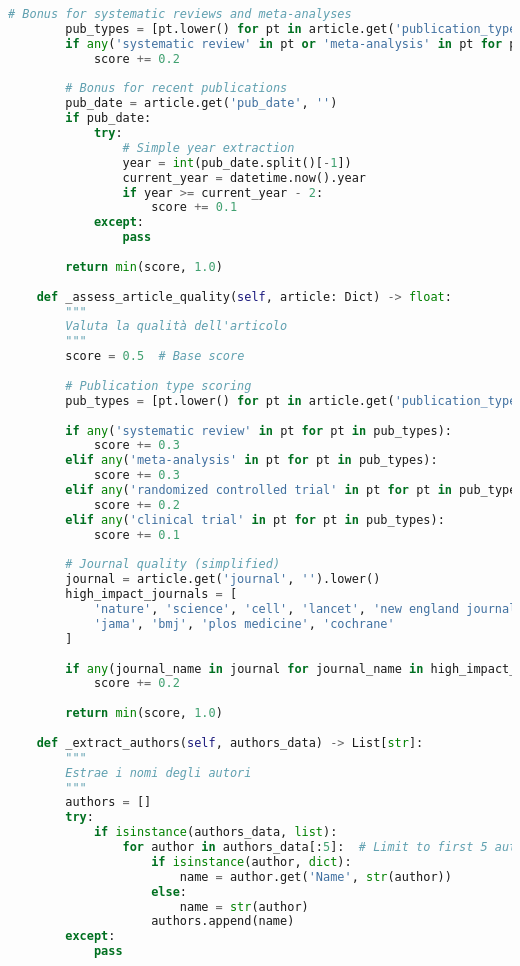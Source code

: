 \documentclass[12pt,a4paper]{report}
\begin{document}
\begin{lstlisting}[language=Python, caption=PubMed Service Implementation]
        # Bonus for systematic reviews and meta-analyses
        pub_types = [pt.lower() for pt in article.get('publication_types', [])]
        if any('systematic review' in pt or 'meta-analysis' in pt for pt in pub_types):
            score += 0.2
        
        # Bonus for recent publications
        pub_date = article.get('pub_date', '')
        if pub_date:
            try:
                # Simple year extraction
                year = int(pub_date.split()[-1])
                current_year = datetime.now().year
                if year >= current_year - 2:
                    score += 0.1
            except:
                pass
        
        return min(score, 1.0)
    
    def _assess_article_quality(self, article: Dict) -> float:
        """
        Valuta la qualità dell'articolo
        """
        score = 0.5  # Base score
        
        # Publication type scoring
        pub_types = [pt.lower() for pt in article.get('publication_types', [])]
        
        if any('systematic review' in pt for pt in pub_types):
            score += 0.3
        elif any('meta-analysis' in pt for pt in pub_types):
            score += 0.3
        elif any('randomized controlled trial' in pt for pt in pub_types):
            score += 0.2
        elif any('clinical trial' in pt for pt in pub_types):
            score += 0.1
        
        # Journal quality (simplified)
        journal = article.get('journal', '').lower()
        high_impact_journals = [
            'nature', 'science', 'cell', 'lancet', 'new england journal',
            'jama', 'bmj', 'plos medicine', 'cochrane'
        ]
        
        if any(journal_name in journal for journal_name in high_impact_journals):
            score += 0.2
        
        return min(score, 1.0)
    
    def _extract_authors(self, authors_data) -> List[str]:
        """
        Estrae i nomi degli autori
        """
        authors = []
        try:
            if isinstance(authors_data, list):
                for author in authors_data[:5]:  # Limit to first 5 authors
                    if isinstance(author, dict):
                        name = author.get('Name', str(author))
                    else:
                        name = str(author)
                    authors.append(name)
        except:
            pass
        

\end{lstlisting}
\end{document}
